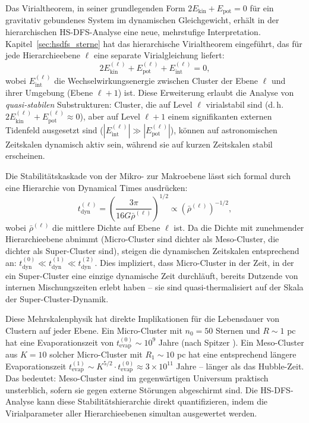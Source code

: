 ﻿\documentclass[a4paper,12pt]{report}
\theoremstyle{definition}
\begin{document}
Das Virialtheorem, in seiner grundlegenden Form $2E_\mathrm{kin} + E_\mathrm{pot} = 0$ für ein gravitativ gebundenes System im dynamischen Gleichgewicht, erhält in der hierarchischen HS-DFS-Analyse eine neue, mehrstufige Interpretation. Kapitel~\ref{sec:hsdfs_sterne} hat das hierarchische Virialtheorem eingeführt, das für jede Hierarchieebene $\ell$ eine separate Virialgleichung liefert:
\[
2E_\mathrm{kin}^{(\ell)} + E_\mathrm{pot}^{(\ell)} + E_\mathrm{int}^{(\ell)} = 0,
\]
wobei $E_\mathrm{int}^{(\ell)}$ die Wechselwirkungsenergie zwischen Cluster der Ebene $\ell$ und ihrer Umgebung (Ebene $\ell+1$) ist. Diese Erweiterung erlaubt die Analyse von \emph{quasi-stabilen} Substrukturen: Cluster, die auf Level $\ell$ virialstabil sind (d.\,h. $2E_\mathrm{kin}^{(\ell)} + E_\mathrm{pot}^{(\ell)} \approx 0$), aber auf Level $\ell+1$ einem signifikanten externen Tidenfeld ausgesetzt sind ($|E_\mathrm{int}^{(\ell)}| \gg |E_\mathrm{pot}^{(\ell)}|$), können auf astronomischen Zeitskalen dynamisch aktiv sein, während sie auf kurzen Zeitskalen stabil erscheinen.

Die Stabilitätskaskade von der Mikro- zur Makroebene lässt sich formal durch eine Hierarchie von Dynamical Times ausdrücken:
\[
t_\mathrm{dyn}^{(\ell)} = \left(\frac{3\pi}{16 G \bar{\rho}^{(\ell)}}\right)^{1/2} \propto \left(\bar{\rho}^{(\ell)}\right)^{-1/2},
\]
wobei $\bar{\rho}^{(\ell)}$ die mittlere Dichte auf Ebene $\ell$ ist. Da die Dichte mit zunehmender Hierarchieebene abnimmt (Micro-Cluster sind dichter als Meso-Cluster, die dichter als Super-Cluster sind), steigen die dynamischen Zeitskalen entsprechend an: $t_\mathrm{dyn}^{(0)} \ll t_\mathrm{dyn}^{(1)} \ll t_\mathrm{dyn}^{(2)}$. Dies impliziert, dass Micro-Cluster in der Zeit, in der ein Super-Cluster eine einzige dynamische Zeit durchläuft, bereits Dutzende von internen Mischungszeiten erlebt haben -- sie sind quasi-thermalisiert auf der Skala der Super-Cluster-Dynamik.

Diese Mehrskalenphysik hat direkte Implikationen für die Lebensdauer von Clustern auf jeder Ebene. Ein Micro-Cluster mit $n_0 = 50$ Sternen und $R \sim 1$ pc hat eine Evaporationszeit von $t_\mathrm{evap}^{(0)} \sim 10^9$ Jahre (nach Spitzer \cite{spitzer1987}). Ein Meso-Cluster aus $K = 10$ solcher Micro-Cluster mit $R_1 \sim 10$ pc hat eine entsprechend längere Evaporationszeit $t_\mathrm{evap}^{(1)} \sim K^{5/2} \cdot t_\mathrm{evap}^{(0)} \approx 3 \times 10^{11}$ Jahre -- länger als das Hubble-Zeit. Das bedeutet: Meso-Cluster sind im gegenwärtigen Universum praktisch unsterblich, sofern sie gegen externe Störungen abgeschirmt sind. Die HS-DFS-Analyse kann diese Stabilitätshierarchie direkt quantifizieren, indem die Virialparameter aller Hierarchieebenen simultan ausgewertet werden.
\end{document}
